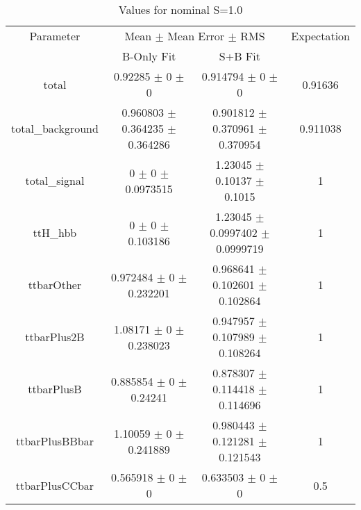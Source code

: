 \begin{table}
\centering
\caption{Values for nominal S=1.0}
\begin{tabular}{cccc}
\toprule
Parameter & \multicolumn{2}{c}{Mean $\pm$ Mean Error $\pm$ RMS} & Expectation\\
 & B-Only Fit & S+B Fit & \\
\midrule
total & \num{0.92285} $\pm$ \num{0} $\pm$ \num{0} & \num{0.914794} $\pm$ \num{0} $\pm$ \num{0} & \num{0.91636}\\
total\_background & \num{0.960803} $\pm$ \num{0.364235} $\pm$ \num{0.364286} & \num{0.901812} $\pm$ \num{0.370961} $\pm$ \num{0.370954} & \num{0.911038}\\
total\_signal & \num{0} $\pm$ \num{0} $\pm$ \num{0.0973515} & \num{1.23045} $\pm$ \num{0.10137} $\pm$ \num{0.1015} & \num{1}\\
ttH\_hbb & \num{0} $\pm$ \num{0} $\pm$ \num{0.103186} & \num{1.23045} $\pm$ \num{0.0997402} $\pm$ \num{0.0999719} & \num{1}\\
ttbarOther & \num{0.972484} $\pm$ \num{0} $\pm$ \num{0.232201} & \num{0.968641} $\pm$ \num{0.102601} $\pm$ \num{0.102864} & \num{1}\\
ttbarPlus2B & \num{1.08171} $\pm$ \num{0} $\pm$ \num{0.238023} & \num{0.947957} $\pm$ \num{0.107989} $\pm$ \num{0.108264} & \num{1}\\
ttbarPlusB & \num{0.885854} $\pm$ \num{0} $\pm$ \num{0.24241} & \num{0.878307} $\pm$ \num{0.114418} $\pm$ \num{0.114696} & \num{1}\\
ttbarPlusBBbar & \num{1.10059} $\pm$ \num{0} $\pm$ \num{0.241889} & \num{0.980443} $\pm$ \num{0.121281} $\pm$ \num{0.121543} & \num{1}\\
ttbarPlusCCbar & \num{0.565918} $\pm$ \num{0} $\pm$ \num{0} & \num{0.633503} $\pm$ \num{0} $\pm$ \num{0} & \num{0.5}\\
\bottomrule
\end{tabular}
\end{table}
